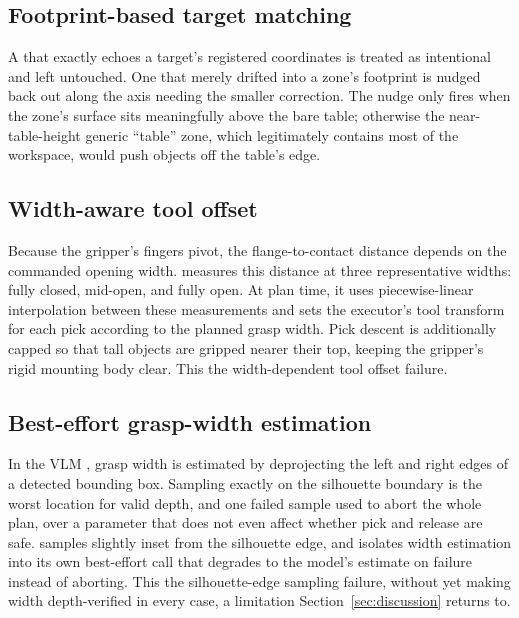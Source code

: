 \subsection{Footprint-based target matching}
\label{sec:fix-footprint}

 A  that
exactly echoes a target's registered coordinates is treated as
intentional and left untouched. One that merely drifted into a zone's
footprint is nudged back out along the axis needing the smaller
correction. The nudge only fires when the zone's surface sits
meaningfully above the bare table; otherwise the near-table-height
generic ``table'' zone, which legitimately contains most of the
workspace, would push objects off the table's edge.

\subsection{Width-aware tool offset}
\label{sec:fix-tcp}

Because the gripper's fingers pivot, the flange-to-contact distance
depends on the commanded opening width. \harness{} measures this
distance at three representative widths: fully closed, mid-open, and
fully open. At plan time, it uses piecewise-linear interpolation
between these measurements and sets the executor's tool transform for
each pick according to the planned grasp width. Pick descent is
additionally capped so that tall objects are gripped nearer their top,
keeping the gripper's rigid mounting body clear. This 
the width-dependent tool offset failure.

\subsection{Best-effort grasp-width estimation}
\label{sec:fix-width}

In the VLM , grasp width is estimated by
deprojecting the left and right edges of a detected bounding box.
Sampling exactly on the silhouette boundary is the worst location for
valid depth, and one failed sample used to abort the whole plan, over
a parameter that does not even affect whether pick and release are
safe. \harness{} samples slightly inset from the silhouette edge, and
isolates width estimation into its own best-effort call that degrades
to the model's estimate on failure instead of aborting. This
 the silhouette-edge sampling failure, without yet
making width depth-verified in every case, a limitation
Section~\ref{sec:discussion} returns to.

